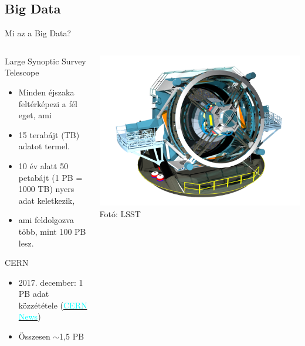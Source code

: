 \subsection{Big Data}
\begin{frame}{Mi az a Big Data?}
    \begin{columns}
        \begin{column}{0.5\textwidth}
            Large Synoptic Survey Telescope
            \begin{itemize}[<+->]
                \item Minden éjszaka feltérképezi a fél eget, ami
                \item 15 terabájt (TB) adatot termel.
                \item 10 év alatt 50 petabájt (1 PB = 1000 TB) nyers adat keletkezik,
                \item ami feldolgozva több, mint 100 PB lesz.
            \end{itemize}
            
            CERN
            \begin{itemize}[<+->]
                \item 2017. december: 1 PB adat közzététele (\href{https://home.cern/news/news/experiments/cms-releases-more-one-petabyte-open-data}{\textcolor{cyan}{CERN News}})
                \item Összesen $\sim$1,5 PB
            \end{itemize}
        \end{column}
        \begin{column}{0.5\textwidth}
            \centering
            \includegraphics[height=0.4\textheight]{figures/lsst.png} \\ %
            \tiny{Fotó: LSST}


\end{column}
\end{columns}
\end{frame}
